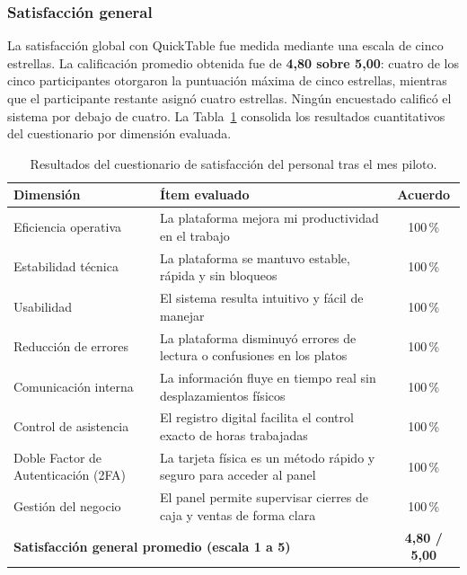 \subsubsection*{Satisfacción general}

La satisfacción global con QuickTable fue medida mediante una escala de cinco estrellas.
La calificación promedio obtenida fue de \textbf{4{,}80 sobre 5{,}00}: cuatro de los cinco
participantes otorgaron la puntuación máxima de cinco estrellas, mientras que el participante
restante asignó cuatro estrellas. Ningún encuestado calificó el sistema por debajo de cuatro.
La Tabla~\ref{tab:satisfaccion_piloto} consolida los resultados cuantitativos del
cuestionario por dimensión evaluada.

\begin{table}[H]
	\centering
	\caption{Resultados del cuestionario de satisfacción del personal tras el mes piloto.}
	\label{tab:satisfaccion_piloto}
	\begin{tabularx}{\textwidth}{l X c}
		\hline
		\textbf{Dimensión} & \textbf{Ítem evaluado} & \textbf{Acuerdo} \\
		\hline
		Eficiencia operativa & 
		La plataforma mejora mi productividad en el trabajo  & 100\,\%  \\
		Estabilidad técnica & 
		La plataforma se mantuvo estable, rápida y sin bloqueos  & 100\,\% \\
		Usabilidad & 
		El sistema resulta intuitivo y fácil de manejar  & 100\,\% \\
		Reducción de errores & 
		La plataforma disminuyó errores de lectura o confusiones en los platos  & 100\,\%  \\
		Comunicación interna & 
		La información fluye en tiempo real sin desplazamientos físicos & 100\,\% \\
		Control de asistencia & 
		El registro digital facilita el control exacto de horas trabajadas  & 100\,\% \\
		Doble Factor de Autenticación (2FA) & 
		La tarjeta física es un método rápido y seguro para acceder al panel  & 100\,\% \\
		Gestión del negocio & 
		El panel permite supervisar cierres de caja y ventas de forma clara  & 100\,\% \\
		\hline
		\multicolumn{2}{l}{\textbf{Satisfacción general promedio (escala 1 a 5)}} & 
		\textbf{4{,}80 / 5{,}00 } \\
		\hline
	\end{tabularx}
\end{table}

